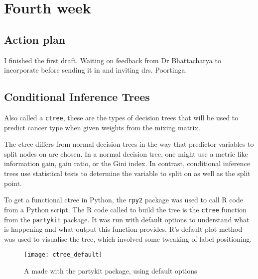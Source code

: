 \chapter{Fourth week}

\section{Action plan}
I finished the first draft. Waiting on feedback from Dr Bhattacharya to incorporate before sending it in and inviting drs. Poortinga.

\section{Conditional Inference Trees}

Also called a \verb|ctree|, these are the types of decision trees that will be used to predict cancer type when given weights from the mixing matrix.

The ctree differs from normal decision trees in the way that predictor variables to split nodes on are chosen.
In a normal decision tree, one might use a metric like information gain, gain ratio, or the Gini index.
In contrast, conditional inference trees use statistical tests to determine the variable to split on as well as the split point.

To get a functional ctree in Python, the \verb|rpy2| package was used to call R code from a Python script.
The R code called to build the tree is the \verb|ctree| function from the \verb|partykit| package.
It was run with default options to understand what is happening and what output this function provides.
R's default plot method was used to visualise the tree, which involved some tweaking of label positioning.

\begin{figure}[H]
    \centering
    \texttt{[image: ctree\_default]}
    \caption{A made with the partykit package, using default options}
    \label{plt:ctree_default}
\end{figure}\hspace{3cm}

